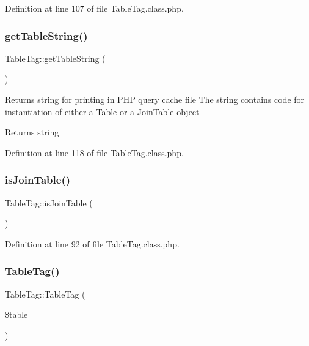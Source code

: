 Definition at line 107 of file Table\+Tag.\+class.\+php.

\hypertarget{classTableTag_a51d350dda88e10bd240831af89e10fd1}{}\label{classTableTag_a51d350dda88e10bd240831af89e10fd1} 
\subsubsection{\texorpdfstring{get\+Table\+String()}{getTableString()}}
{\footnotesize\ttfamily Table\+Tag\+::get\+Table\+String (\begin{DoxyParamCaption}{ }\end{DoxyParamCaption})}

Returns string for printing in P\+HP query cache file The string contains code for instantiation of either a \hyperlink{classTable}{Table} or a \hyperlink{classJoinTable}{Join\+Table} object \begin{DoxyReturn}{Returns}
string 
\end{DoxyReturn}


Definition at line 118 of file Table\+Tag.\+class.\+php.

\hypertarget{classTableTag_ac27cd91a8df4854bc7598260a030bd7b}{}\label{classTableTag_ac27cd91a8df4854bc7598260a030bd7b} 
\subsubsection{\texorpdfstring{is\+Join\+Table()}{isJoinTable()}}
{\footnotesize\ttfamily Table\+Tag\+::is\+Join\+Table (\begin{DoxyParamCaption}{ }\end{DoxyParamCaption})}



Definition at line 92 of file Table\+Tag.\+class.\+php.

\hypertarget{classTableTag_a27f151c3ff35cf3a89242ae896fae444}{}\label{classTableTag_a27f151c3ff35cf3a89242ae896fae444} 
\subsubsection{\texorpdfstring{Table\+Tag()}{TableTag()}}
{\footnotesize\ttfamily Table\+Tag\+::\+Table\+Tag (\begin{DoxyParamCaption}\item[{}]{\$table }\end{DoxyParamCaption})}

